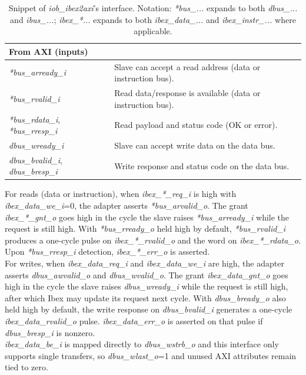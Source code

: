 \begin{table}[H]
\begin{tabularx}{\textwidth}{|l|X|}
\hline
\multicolumn{2}{|l|}{From AXI (inputs)} \\
\hline
\textit{*bus\_arready\_i} & Slave can accept a read address (data or instruction bus). \\
\textit{*bus\_rvalid\_i} & Read data/response is available (data or instruction bus). \\
\textit{*bus\_rdata\_i}, \textit{*bus\_rresp\_i} & Read payload and status code (OK or error). \\
\textit{dbus\_wready\_i} & Slave can accept write data on the data bus. \\
\textit{dbus\_bvalid\_i}, \textit{dbus\_bresp\_i} & Write response and status code on the data bus. \\
\hline
\end{tabularx}
\caption{Snippet of \textit{iob\_ibex2axi}'s interface. Notation: \textit{*bus\_...} expands to both \textit{dbus\_...} and \textit{ibus\_...}; \textit{ibex\_*...} expands to both \textit{ibex\_data\_...} and \textit{ibex\_instr\_...} where applicable.}
\label{tab:axi2ibex}
\end{table}

 For reads (data or instruction), when \textit{ibex\_*\_req\_i} is high with \textit{ibex\_data\_we\_i}=0, the adapter asserts \textit{*bus\_arvalid\_o}. The grant \textit{ibex\_*\_gnt\_o} goes high in the cycle the slave raises \textit{*bus\_arready\_i} while the request is still high. With \textit{*bus\_rready\_o} held high by default, \textit{*bus\_rvalid\_i} produces a one-cycle pulse on \textit{ibex\_*\_rvalid\_o} and the word on \textit{ibex\_*\_rdata\_o}. Upon \textit{*bus\_rresp\_i} detection, \textit{ibex\_*\_err\_o} is asserted.\\
For writes, when \textit{ibex\_data\_req\_i} and \textit{ibex\_data\_we\_i} are high, the adapter asserts \textit{dbus\_awvalid\_o} and \textit{dbus\_wvalid\_o}. The grant \textit{ibex\_data\_gnt\_o} goes high in the cycle the slave raises \textit{dbus\_wready\_i} while the request is still high, after which Ibex may update its request next cycle. With \textit{dbus\_bready\_o} also held high by default, the write response on \textit{dbus\_bvalid\_i} generates a one-cycle \textit{ibex\_data\_rvalid\_o} pulse. \textit{ibex\_data\_err\_o} is asserted on that pulse if \textit{dbus\_bresp\_i} is nonzero.\\
\textit{ibex\_data\_be\_i} is mapped directly to \textit{dbus\_wstrb\_o} and this interface only supports single transfers, so \textit{dbus\_wlast\_o}=1 and unused AXI attributes remain tied to zero.




